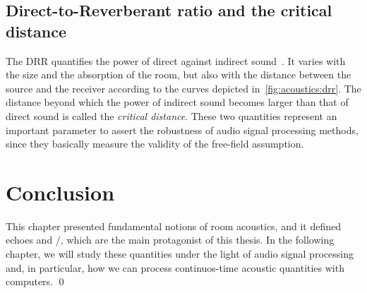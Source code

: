 \subsection{Direct-to-Reverberant ratio and the critical distance}\label{ch:acoustics:subsec:drr}
The \acf{DRR} quantifies the power of direct against indirect sound~.
It varies with the size and the absorption of the room, but also with the distance between the source and the receiver according to the curves depicted in~\cref{fig:acoustics:drr}.
The distance beyond which the power of indirect sound becomes larger than that of direct sound is called the \textit{critical distance}.
These two quantities represent an important parameter to assert the robustness of audio signal processing methods, since they basically measure the validity of the free-field assumption.

\section{Conclusion}
This chapter presented fundamental notions of room acoustics, and it defined echoes and \RIRs/, which are the main protagonist of this thesis.
In the following chapter, we will study these quantities under the light of audio signal processing and, in particular, how we can process continuos-time acoustic quantities with computers.
\qed